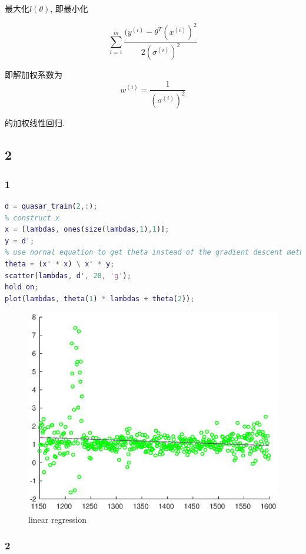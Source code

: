 \documentclass{ctexart}
\begin{document}
最大化$l(\theta)$, 即最小化

$$
	\sum_{i=1}^m \frac{(y^{(i)}-\theta^T(x^{(i)})^2}{2(\sigma^{(i)})^2}
$$

即解加权系数为
$$
	w^{(i)} = \frac{1}{(\sigma^{(i)})^2}
$$

的加权线性回归.

\subsection{2}

\subsubsection{1}
\begin{lstlisting}[language = MATLAB]
d = quasar_train(2,:);
% construct x 
x = [lambdas, ones(size(lambdas,1),1)];
y = d';
% use nornal equation to get theta instead of the gradient descent method
theta = (x' * x) \ x' * y;
scatter(lambdas, d', 20, 'g');
hold on;
plot(lambdas, theta(1) * lambdas + theta(2));	
\end{lstlisting}

\begin{figure}[ht]
	\includegraphics[width = \textwidth]{linear_regression.eps}
	\caption{linear regression}
	\label{logistic}
\end{figure}

\subsubsection{2}
\end{document}
